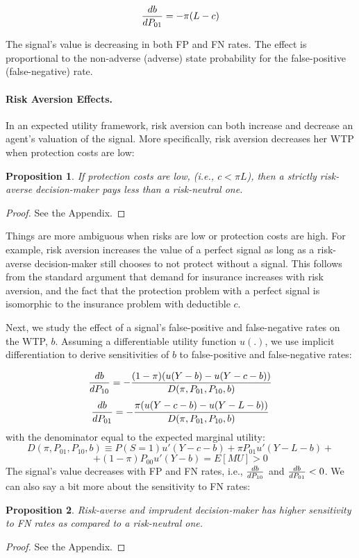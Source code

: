 \documentclass[12pt,a4paper]{article}
\newtheorem{theorem}{Proposition}
\begin{document}
\begin{equation}\label{eq:dWTP_dFN}
{db\over dP_{01}}=-\pi(L-c)
\end{equation}
\vspace{10pt}

The signal's value is decreasing in both FP and FN rates. The effect is proportional to the non-adverse (adverse) state probability for the false-positive (false-negative) rate.

\paragraph{Risk Aversion Effects.} In an expected utility framework, risk aversion can both increase and decrease an agent's valuation of the signal. More specifically, risk aversion decreases her WTP when protection costs are low: 

\begin{theorem}
 If protection costs are low, (i.e., $c<\pi L$), then a strictly risk-averse decision-maker pays less than a risk-neutral one.
\end{theorem} 
\begin{proof}
See the Appendix.
\end{proof}

Things are more ambiguous when risks are low or protection costs are high. For example, risk aversion increases the value of a perfect signal as long as a risk-averse decision-maker still chooses to not protect without a signal. This follows from the standard argument that demand for insurance increases with risk aversion, and the fact that the protection problem with a perfect signal is isomorphic to the insurance problem with deductible $c$. 

Next, we study the effect of a signal's false-positive and false-negative rates on the WTP, $b$. Assuming a differentiable utility function $u(.)$, we use implicit differentiation to derive sensitivities of $b$ to false-positive and false-negative rates:

$${db\over dP_{10}}=-{(1-\pi)(u(Y-b)-u(Y-c-b))\over D(\pi, P_{01}, P_{10}, b)}$$
$${db\over dP_{01}}=-{\pi(u(Y-c-b)-u(Y-L-b))\over D(\pi, P_{01}, P_{10}, b)}$$
with the denominator equal to the expected marginal utility:
$$D(\pi, P_{01}, P_{10}, b)\equiv P(S=1)u'(Y-c-b)+\pi P_{01}u'(Y-L-b)+$$
$$+(1-\pi)P_{00}u'(Y-b)=E[MU]>0$$
The signal's value decreases with FP and FN rates, i.e., ${db\over dP_{10}}$ and ${db\over dP_{01}}<0$. We can also say a bit more about the sensitivity to FN rates:
\begin{theorem}
Risk-averse and imprudent decision-maker has higher sensitivity to FN rates as compared to a risk-neutral one.
\end{theorem}\label{thm:riskAverse}  
\begin{proof}
See the Appendix.
\end{proof}
\end{document}
